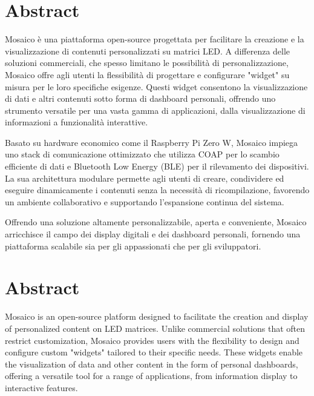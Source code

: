 \documentclass[12pt,a4paper,twoside]{book}
\begin{document}

\chapter*{Abstract}  
Mosaico è una piattaforma open-source progettata per facilitare la creazione e la visualizzazione di contenuti personalizzati su matrici LED. A differenza delle soluzioni commerciali, che spesso limitano le possibilità di personalizzazione, Mosaico offre agli utenti la flessibilità di progettare e configurare "widget" su misura per le loro specifiche esigenze. Questi widget consentono la visualizzazione di dati e altri contenuti sotto forma di dashboard personali, offrendo uno strumento versatile per una vasta gamma di applicazioni, dalla visualizzazione di informazioni a funzionalità interattive.

Basato su hardware economico come il Raspberry Pi Zero W, Mosaico impiega uno stack di comunicazione ottimizzato che utilizza COAP per lo scambio efficiente di dati e Bluetooth Low Energy (BLE) per il rilevamento dei dispositivi. La sua architettura modulare permette agli utenti di creare, condividere ed eseguire dinamicamente i contenuti senza la necessità di ricompilazione, favorendo un ambiente collaborativo e supportando l'espansione continua del sistema.

Offrendo una soluzione altamente personalizzabile, aperta e conveniente, Mosaico arricchisce il campo dei display digitali e dei dashboard personali, fornendo una piattaforma scalabile sia per gli appassionati che per gli sviluppatori.



\chapter*{Abstract}
Mosaico is an open-source platform designed to facilitate the creation and display of personalized content on LED matrices. Unlike commercial solutions that often restrict customization, Mosaico provides users with the flexibility to design and configure custom "widgets" tailored to their specific needs. These widgets enable the visualization of data and other content in the form of personal dashboards, offering a versatile tool for a range of applications, from information display to interactive features.
\end{document}
